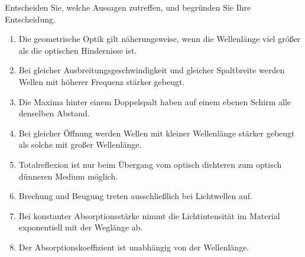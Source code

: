 \begin{ExerciseBlock}
Entscheiden Sie, welche Aussagen zutreffen, und begründen Sie Ihre Entscheidung.
\begin{enumerate}
\item Die geometrische Optik gilt näherungsweise, wenn die Wellenlänge viel größer als die optischen Hindernisse ist.
\item Bei gleicher Ausbreitungsgeschwindigkeit und gleicher Spaltbreite werden Wellen mit höherer Frequenz stärker gebeugt.
\item Die Maxima hinter einem Doppelspalt haben auf einem ebenen Schirm alle denselben Abstand.
\item Bei gleicher Öffnung werden Wellen mit kleiner Wellenlänge stärker gebeugt als solche mit großer Wellenlänge.
\item Totalreflexion ist nur beim Übergang vom optisch dichteren zum optisch dünneren Medium möglich.
\item Brechung und Beugung treten ausschließlich bei Lichtwellen auf.
\item Bei konstanter Absorptionsstärke nimmt die Lichtintensität im Material exponentiell mit der Weglänge ab.
\item Der Absorptionskoeffizient ist unabhängig von der Wellenlänge.
\end{enumerate}
\end{ExerciseBlock}
